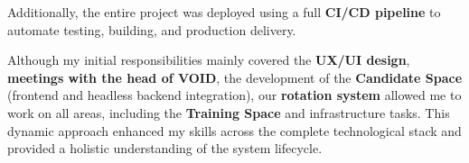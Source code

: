 \medskip

\noindent
Additionally, the entire project was deployed using a full \textbf{CI/CD pipeline} to automate testing, building, and production delivery.

\medskip

\noindent
Although my initial responsibilities mainly covered the \textbf{UX/UI design}, \textbf{meetings with the head of VOID}, the development of the \textbf{Candidate Space} (frontend and headless backend integration), our \textbf{rotation system} allowed me to work on all areas, including the \textbf{Training Space} and infrastructure tasks.  
This dynamic approach enhanced my skills across the complete technological stack and provided a holistic understanding of the system lifecycle.

